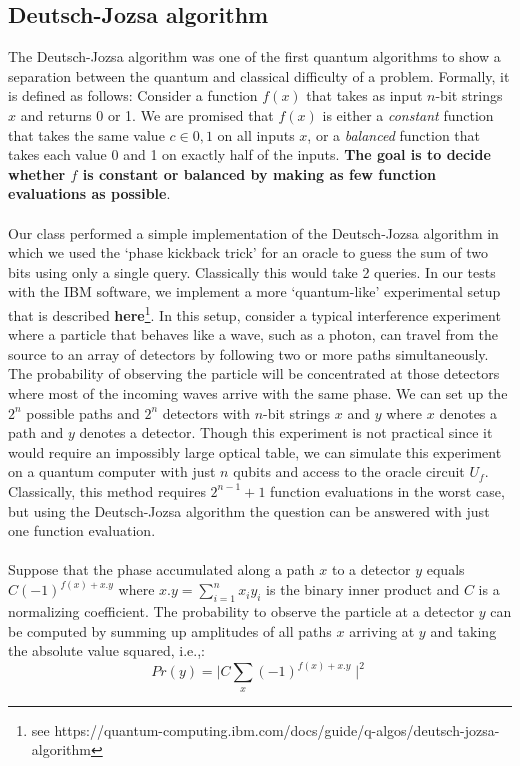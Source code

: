 \documentclass[12pt]{article}
\begin{document}
    \subsection{Deutsch-Jozsa algorithm}
    The Deutsch-Jozsa algorithm was one of the first quantum algorithms to show a separation between the quantum and classical difficulty of a problem. Formally, it is defined as follows: Consider a function $f(x)$ that takes as input $n$-bit strings $x$ and returns 0 or 1. We are promised that $f(x)$ is either a \emph{constant} function that takes the same value $c \in {0,1}$ on all inputs $x$, or a \emph{balanced} function that takes each value 0 and 1 on exactly half of the inputs. \textbf{The goal is to decide whether $f$ is constant or balanced by making as few function evaluations as possible}. 
    \\
    \smallskip
    \\
    Our class performed a simple implementation of the Deutsch-Jozsa algorithm in which we used the `phase kickback trick' for an oracle to guess the sum of two bits using only a single query. Classically this would take 2 queries. %
    In our tests with the IBM software, we implement a more `quantum-like' experimental setup that is described \textbf{here}\footnote{see https://quantum-computing.ibm.com/docs/guide/q-algos/deutsch-jozsa-algorithm}. In this setup, consider a typical interference experiment where a particle that behaves like a wave, such as a photon, can travel from the source to an array of detectors by following two or more paths simultaneously. The probability of observing the particle will be concentrated at those detectors where most of the incoming waves arrive with the same phase. 
    We can set up the $2^n$ possible paths and $2^n$ detectors with $n$-bit strings $x$ and $y$ where $x$ denotes a path and $y$ denotes a detector. Though this experiment is not practical since it would require an impossibly large optical table, we can simulate this experiment on a quantum computer with just $n$ qubits and access to the oracle circuit $U_f$. Classically, this method requires $2^{n-1}+1$ function evaluations in the worst case, but using the Deutsch-Jozsa algorithm the question can be answered with just one function evaluation.
    \\
    \smallskip
    \\
    Suppose that the phase accumulated along a path $x$ to a detector $y$ equals $C(-1)^{f(x)+x.y}$ where $x.y = \sum_{i=1}^{n} x_{i}y_{i}$ is the binary inner product and $C$ is a normalizing coefficient. The probability to observe the particle at a detector $y$ can be computed by summing up amplitudes of all paths $x$ arriving at $y$ and taking the absolute value squared, i.e.,:
    \begin{equation}
        Pr(y) = \mid C\sum_{x}(-1)^{f(x)+x.y} \mid^{2}
    \end{equation}
    
\end{document}

